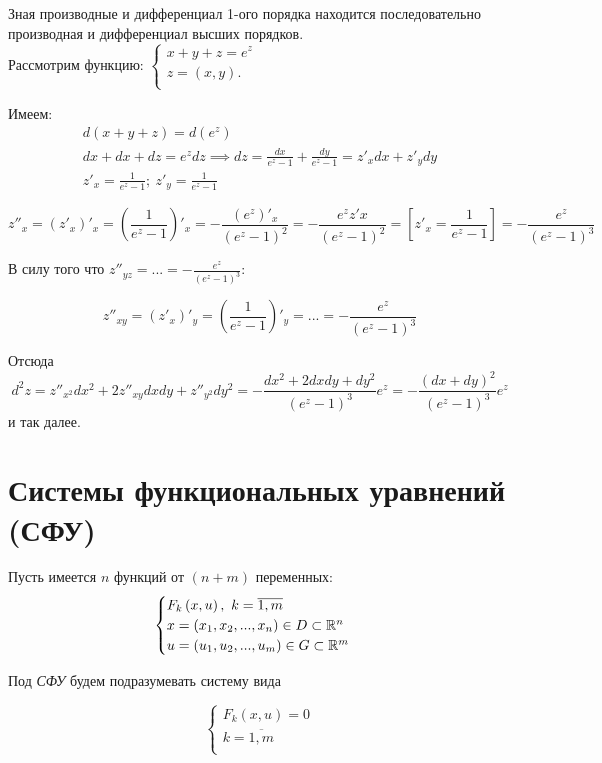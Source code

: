 \documentclass[../../main.tex]{subfiles}
\begin{document}
\begin{exmp}
Зная производные и дифференциал 1-ого порядка находится последовательно
производная и дифференциал высших порядков. \\
Рассмотрим функцию:
$\begin{cases}
    x + y + z = e^z \\
    z = \left(x, y\right). \\
\end{cases}$

Имеем:
\[
\begin{array}{l}
d\left(x + y + z\right) = d(e^z) \\
dx + dx + dz = e^zdz \implies dz = \frac{dx}{e^z - 1}
+ \frac{dy}{e^z - 1} = z'_xdx + z'_ydy \\
z'_x = \frac{1}{e^z - 1};\ z'_y = \frac{1}{e^z - 1}
\end{array}
\]

\[z''_x = \left(z'_x\right)'_x = \left(\frac{1}{e^z - 1}\right)'_x
= -\frac{\left(e^z\right)'_x}{\left(e^z - 1\right)^2} =
- \frac{e^zz'x}{\left(e^z - 1\right)^2} = \left[z'_x
= \frac{1}{e^z - 1} \right] =
- \frac{e^z}{\left(e^z - 1\right)^3}\]

В силу того что $\displaystyle z''_{yz} = ... = - 
\frac{e^z}{\left(e^z - 1\right)^3}$:

\[z''_{xy} = \left(z'_x\right)'_y = \left(\frac{1}{e^z - 1} \right)'_y = ... =
- \frac{e^z}{\left(e^z - 1\right)^3}\]

Отсюда
\[d^2z = z''_{x^2}dx^2 + 2z''_{xy}dxdy + z''_{y^2}dy^2 =
-\frac{dx^2 + 2dxdy + dy^2}{\left(e^z - 1\right)^3} e^z = 
-\frac{\left(dx + dy\right)^2}{\left(e^z - 1\right)^3} e^z\]
и так далее.
\end{exmp}

\section{Системы функциональных уравнений (СФУ)}
Пусть имеется $n$ функций от $\left(n + m\right)$ переменных:
\[\begin{cases}
    F_k\left(x, u \right),\ k = \overline{1, m} \\
    x = \left(x_1, x_2, ..., x_n\right) \in D \subset \mathbb{R}^n \\
    u = \left(u_1, u_2, ..., u_m\right) \in G \subset \mathbb{R}^m
\end{cases}
\]

Под \emph{СФУ} будем подразумевать систему вида

\begin{equation}
    \label{lec_9.num_7}
    \begin{cases} 
        F_k\left(x, u\right) = 0 \\ 
        k = \overline{1, m} \\
    \end{cases}    
\end{equation}
\end{document}
